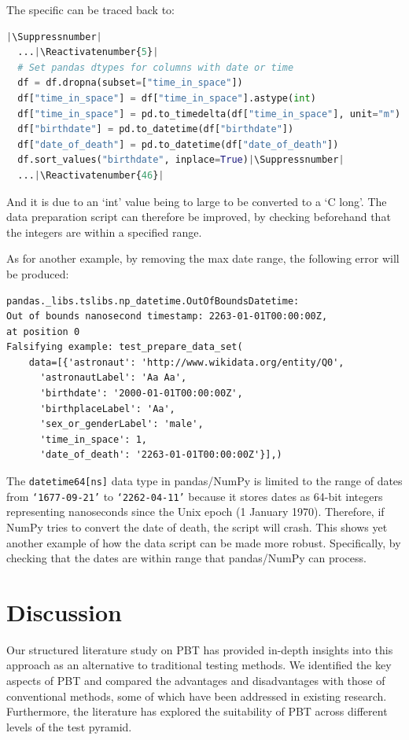 \documentclass[runningheads]{llncs}
\makeatletter
\let\origthelstnumber\thelstnumber
\newcommand*\Suppressnumber{%
  \lst@AddToHook{OnNewLine}{%
    \let\thelstnumber\relax%
     \advance\c@lstnumber-\@ne\relax%
    }%
}
\newcommand*\Reactivatenumber[1]{%
  \setcounter{lstnumber}{\numexpr#1-1\relax}
  \lst@AddToHook{OnNewLine}{%
   \let\thelstnumber\origthelstnumber%
   \refstepcounter{lstnumber}%
  }%
}
\makeatother
\begin{document}
\noindent The specific can be traced back to:

\begin{lstlisting}[language=Python,caption={Prepare Data Set from code/data\_analysis.ipynb}]
  |\Suppressnumber|
  ...|\Reactivatenumber{5}|
  # Set pandas dtypes for columns with date or time
  df = df.dropna(subset=["time_in_space"])
  df["time_in_space"] = df["time_in_space"].astype(int)
  df["time_in_space"] = pd.to_timedelta(df["time_in_space"], unit="m")
  df["birthdate"] = pd.to_datetime(df["birthdate"])
  df["date_of_death"] = pd.to_datetime(df["date_of_death"])
  df.sort_values("birthdate", inplace=True)|\Suppressnumber|
  ...|\Reactivatenumber{46}|

\end{lstlisting}
And it is due to an `int' value being to large to be converted to a `C long'. The data preparation script can therefore be improved, by checking beforehand that the integers are within a specified range.

\vspace{5mm}
\noindent As for another example, by removing the max date range, the following error will be produced:

\begin{verbatim}
pandas._libs.tslibs.np_datetime.OutOfBoundsDatetime: 
Out of bounds nanosecond timestamp: 2263-01-01T00:00:00Z, 
at position 0
Falsifying example: test_prepare_data_set(
    data=[{'astronaut': 'http://www.wikidata.org/entity/Q0',
      'astronautLabel': 'Aa Aa',
      'birthdate': '2000-01-01T00:00:00Z',
      'birthplaceLabel': 'Aa',
      'sex_or_genderLabel': 'male',
      'time_in_space': 1,
      'date_of_death': '2263-01-01T00:00:00Z'}],) 
\end{verbatim}

\vspace{5mm}
\noindent The \texttt{datetime64[ns]} data type in pandas/NumPy is limited to the range of dates from \texttt{`1677-09-21'} to \texttt{`2262-04-11'} because it stores dates as 64-bit integers representing nanoseconds since the Unix epoch (1 January 1970). Therefore, if NumPy tries to convert the date of death, the script will crash. This shows yet another example of how the data script can be made more robust. Specifically, by checking that the dates are within range that pandas/NumPy can process.

\section{Discussion}
Our structured literature study on PBT has provided in-depth insights into this approach as an alternative to traditional testing methods. We identified the key aspects of PBT and compared the advantages and disadvantages with those of conventional methods, some of which have been addressed in existing research. Furthermore, the literature has explored the suitability of PBT across different levels of the test pyramid.
\end{document}
